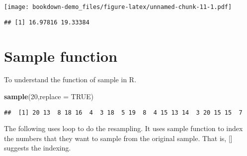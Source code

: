 \documentclass[]{book}
\newenvironment{Shaded}{\begin{snugshade}}{\end{snugshade}}
\newcommand{\ControlFlowTok}[1]{\textcolor[rgb]{0.13,0.29,0.53}{\textbf{#1}}}
\newcommand{\DataTypeTok}[1]{\textcolor[rgb]{0.13,0.29,0.53}{#1}}
\newcommand{\DecValTok}[1]{\textcolor[rgb]{0.00,0.00,0.81}{#1}}
\newcommand{\KeywordTok}[1]{\textcolor[rgb]{0.13,0.29,0.53}{\textbf{#1}}}
\newcommand{\NormalTok}[1]{#1}
\newcommand{\OperatorTok}[1]{\textcolor[rgb]{0.81,0.36,0.00}{\textbf{#1}}}
\newcommand{\OtherTok}[1]{\textcolor[rgb]{0.56,0.35,0.01}{#1}}
\newcommand{\StringTok}[1]{\textcolor[rgb]{0.31,0.60,0.02}{#1}}
\begin{document}
\texttt{[image: bookdown-demo\_files/figure-latex/unnamed-chunk-11-1.pdf]}

\begin{verbatim}
## [1] 16.97816 19.33384
\end{verbatim}

\hypertarget{sample-function}{%
\section{Sample function}\label{sample-function}}

To understand the function of sample in R.

\begin{Shaded}
\begin{Highlighting}[]
\KeywordTok{sample}\NormalTok{(}\DecValTok{20}\NormalTok{,}\DataTypeTok{replace =} \OtherTok{TRUE}\NormalTok{)}
\end{Highlighting}
\end{Shaded}

\begin{verbatim}
##  [1] 20 13  8 18 16  4  3 18  5 19  8  4 15 13 14  3 20 15 15  7
\end{verbatim}

The following uses loop to do the resampling. It uses sample function to index the numbers that they want to sample from the original sample. That is, {[}{]} suggests the indexing.

\begin{Shaded}
\end{Shaded}
\end{document}
